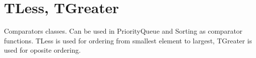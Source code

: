 \chapter{TLess, TGreater}

Comparators classes. Can be used in PriorityQueue and Sorting as comparator functions.
TLess is used for ordering from smallest element to largest, TGreater is used for oposite ordering.


%

